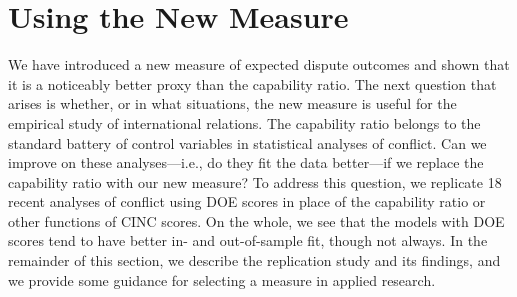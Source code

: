 \section{Using the New Measure}
\label{sec:replications}

We have introduced a new measure of expected dispute outcomes and shown that it is a noticeably better proxy than the capability ratio.
The next question that arises is whether, or in what situations, the new measure is useful for the empirical study of international relations.
The capability ratio belongs to the standard battery of control variables in statistical analyses of conflict.
Can we improve on these analyses---i.e., do they fit the data better---if we replace the capability ratio with our new measure?
To address this question, we replicate 18 recent analyses of conflict using DOE scores in place of the capability ratio or other functions of CINC scores.
On the whole, we see that the models with DOE scores tend to have better in- and out-of-sample fit, though not always.
In the remainder of this section, we describe the replication study and its findings, and we provide some guidance for selecting a measure in applied research.


